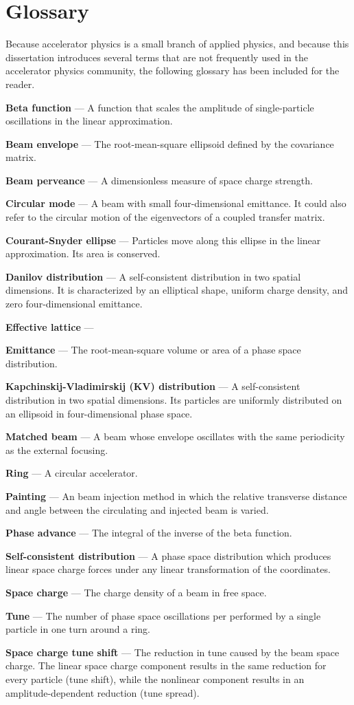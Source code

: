 \chapter*{Glossary} 

Because accelerator physics is a small branch of applied physics, and because this dissertation introduces several terms that are not frequently used in the accelerator physics community, the following glossary has been included for the reader.

\textbf{Beta function} — A function that scales the amplitude of single-particle oscillations in the linear approximation.

\textbf{Beam envelope} — The root-mean-square ellipsoid defined by the covariance matrix.

\textbf{Beam perveance} — A dimensionless measure of space charge strength.

\textbf{Circular mode} — A beam with small four-dimensional emittance. It could also refer to the circular motion of the eigenvectors of a coupled transfer matrix.

\textbf{Courant-Snyder ellipse} — Particles move along this ellipse in the linear approximation. Its area is conserved.

\textbf{Danilov distribution} — A self-consistent distribution in two spatial dimensions. It is characterized by an elliptical shape, uniform charge density, and zero four-dimensional emittance.

\textbf{Effective lattice} —

\textbf{Emittance} — The root-mean-square volume or area of a phase space distribution.

\textbf{Kapchinskij-Vladimirskij (KV) distribution} — A self-consistent distribution in two spatial dimensions. Its particles are uniformly distributed on an ellipsoid in four-dimensional phase space.

\textbf{Matched beam} — A beam whose envelope oscillates with the same periodicity as the external focusing.

\textbf{Ring} — A circular accelerator.

\textbf{Painting} — An beam injection method in which the relative transverse distance and angle between the circulating and injected beam is varied.  

\textbf{Phase advance} — The integral of the inverse of the beta function. 

\textbf{Self-consistent distribution} — A phase space distribution which produces linear space charge forces under any linear transformation of the coordinates.

\textbf{Space charge} — The charge density of a beam in free space.

\textbf{Tune} — The number of phase space oscillations per performed by a single particle in one turn around a ring.

\textbf{Space charge tune shift} — The reduction in tune caused by the beam space charge. The linear space charge component results in the same reduction for every particle (tune shift), while the nonlinear component results in an amplitude-dependent reduction (tune spread).